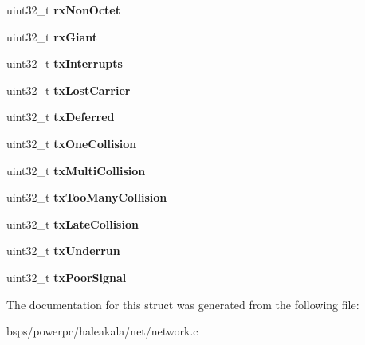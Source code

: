 \begin{DoxyCompactItemize}
uint32\+\_\+t {\bfseries rx\+Non\+Octet}
\item 
\mbox{\label{structEMACLocals_a5267a4744e37d49ba7ad7e17231ebef1}} 
uint32\+\_\+t {\bfseries rx\+Giant}
\item 
\mbox{\label{structEMACLocals_a048bb8d06eabb875814a5d07d8e8c32b}} 
uint32\+\_\+t {\bfseries tx\+Interrupts}
\item 
\mbox{\label{structEMACLocals_a2de9fd1cc9268091829e68f277ee39b8}} 
uint32\+\_\+t {\bfseries tx\+Lost\+Carrier}
\item 
\mbox{\label{structEMACLocals_a5870582ae438ddb932364c5bbf423f21}} 
uint32\+\_\+t {\bfseries tx\+Deferred}
\item 
\mbox{\label{structEMACLocals_a4f1e251bf8f576e19534a79c3c73b1b4}} 
uint32\+\_\+t {\bfseries tx\+One\+Collision}
\item 
\mbox{\label{structEMACLocals_afbb766a1dddbf88f1db5a5b270a973f1}} 
uint32\+\_\+t {\bfseries tx\+Multi\+Collision}
\item 
\mbox{\label{structEMACLocals_a7a0a1fd19b65b4231009333948f655e6}} 
uint32\+\_\+t {\bfseries tx\+Too\+Many\+Collision}
\item 
\mbox{\label{structEMACLocals_a039a61f89339288d1b97f7e71f7947cf}} 
uint32\+\_\+t {\bfseries tx\+Late\+Collision}
\item 
\mbox{\label{structEMACLocals_a135fd551041d290cd40f2c581c76506e}} 
uint32\+\_\+t {\bfseries tx\+Underrun}
\item 
\mbox{\label{structEMACLocals_a82e815fc8abd0fd030ab54fa9335bff1}} 
uint32\+\_\+t {\bfseries tx\+Poor\+Signal}
\end{DoxyCompactItemize}


The documentation for this struct was generated from the following file\+:\begin{DoxyCompactItemize}
\item 
bsps/powerpc/haleakala/net/network.\+c\end{DoxyCompactItemize}
